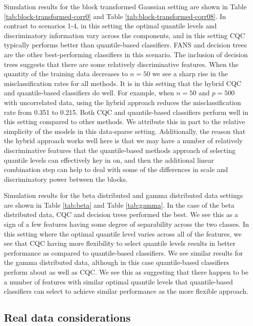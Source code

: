 \documentclass{article}
\begin{document}
Simulation results for the block transformed Gaussian setting are shown in Table
\ref{tab:block-transformed-corr0} and Table \ref{tab:block-transformed-corr08}.
In contrast to scenarios 1-4, in this setting the optimal quantile levels and
discriminatory information vary across the components, and in this setting CQC
typically performs better than quantile-based classifiers.  FANS and decision
trees are the other best-performing classifiers in this scenario.  The inclusion
of decision trees suggests that there are some relatively discriminative
features.  When the quantity of the training data decreases to $n = 50$ we see a
sharp rise in the misclassification rates for all methods.  It is in this
setting that the hybrid CQC and quantile-based classifiers do well.  For
example, when $n = 50$ and $p = 500$ with uncorrelated data, using the hybrid
approach reduces the misclassification rate from 0.351 to 0.215.  Both CQC and
quantile-based classifiers perform well in this setting compared to other
methods.  We attribute this in part to the relative simplicity of the models in
this data-sparse setting.  Additionally, the reason that the hybrid approach
works well here is that we may have a number of relatively discriminative
features that the quantile-based methods approach of selecting quantile levels
can effectively key in on, and then the additional linear combination step can
help to deal with some of the differences in scale and discriminatory power
between the blocks.

Simulation results for the beta distributed and gamma distributed data settings
are shown in Table \ref{tab:beta} and Table
\ref{tab:gamma}.  In the case of the beta distributed data,
CQC and decision trees performed the best.  We see this as a sign of a few
features having some degree of separability across the two classes.  In this
setting where the optimal quantile level varies across all of the features, we
see that CQC having more flexibility to select quantile levels results in better
performance as compared to quantile-based classifiers.  We see similar results
for the gamma distributed data, although in this case quantile-based classifiers
perform about as well as CQC.  We see this as suggesting that there happen to be
a number of features with similar optimal quantile levels that quantile-based
classifiers can select to achieve similar performance as the more flexible
approach.




\subsection{Real data considerations}
\end{document}
